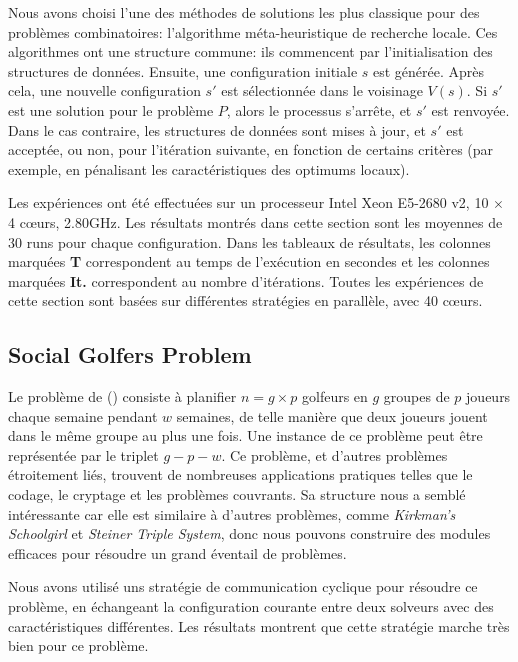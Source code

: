 Nous avons choisi l'une des méthodes de solutions les plus classique pour des problèmes combinatoires: l'algorithme méta-heuristique de recherche locale. Ces algorithmes ont une structure commune: ils commencent par l'initialisation des structures de données. Ensuite, une configuration initiale $s$ est générée. Après cela, une nouvelle configuration $s'$ est sélectionnée dans le voisinage $V \left(s \right) $. Si $s'$ est une solution pour le problème $P$, alors le processus s'arrête, et $s'$ est renvoyée. Dans le cas contraire, les structures de données sont mises à jour, et $s'$ est acceptée, ou non, pour l'itération suivante, en fonction de certains critères (par exemple, en pénalisant les caractéristiques des optimums locaux).

Les expériences ont été effectuées sur un processeur Intel \R{} Xeon \TM{} E5-2680 v2, 10 $\times$ 4 c\oe urs, 2.80GHz. Les résultats montrés dans cette section sont les moyennes de 30 runs pour chaque configuration. Dans les tableaux de résultats, les colonnes marquées {\bf T} correspondent au temps de l'exécution en secondes et les colonnes marquées {\bf It.} correspondent au nombre d'itérations. Toutes les expériences de cette section sont basées sur différentes stratégies en parallèle, avec 40 c\oe urs.

\subsection{Social Golfers Problem}

Le problème de \sg{} (\SGP) consiste à planifier $n = g \times p$ golfeurs en $g$ groupes de $p$ joueurs chaque semaine pendant $w$ semaines, de telle manière que deux joueurs jouent dans le même groupe au plus une fois. Une instance de ce problème peut être représentée par le triplet $g-p-w$. Ce problème, et d'autres problèmes étroitement liés, trouvent de nombreuses applications pratiques telles que le codage, le cryptage et les problèmes couvrants. Sa structure nous a semblé intéressante car elle est similaire à d'autres problèmes, comme {\it Kirkman's Schoolgirl} et {\it Steiner Triple System}, donc nous pouvons construire des modules efficaces pour résoudre un grand éventail de problèmes.

Nous avons utilisé uns stratégie de communication cyclique pour résoudre ce problème, en échangeant la configuration courante entre deux solveurs avec des caractéristiques différentes. Les résultats montrent que cette stratégie marche très bien pour ce problème.

